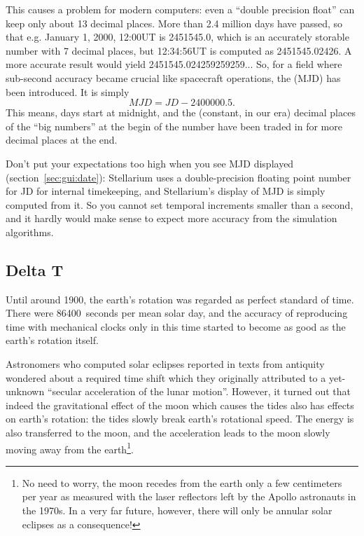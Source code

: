 This causes a problem for modern computers: even a ``double precision
float'' can keep only about 13 decimal places. More than 2.4 million
days have passed, so that e.g. January 1, 2000, 12:00UT is 2451545.0,
which is an accurately storable number with 7 decimal places, but 12:34:56UT is computed as
2451545.02426. A more accurate result would yield
2451545.024259259259... So, for a field where sub-second accuracy
became crucial like spacecraft operations, the  (MJD) has been introduced. It is simply
\begin{equation}
  \label{eq:MJD}
  MJD=JD-2400000.5. 
\end{equation}
This means, days start at midnight, and the (constant, in our era)
decimal places of the ``big numbers'' at the begin of the number have
been traded in for more decimal places at the end. 

Don't put your expectations too high when you see MJD displayed
(section~\ref{sec:gui:date}): Stellarium uses a double-precision
floating point number for JD for internal timekeeping, and Stellarium's
display of MJD is simply computed from it. So you cannot set temporal
increments smaller than a second, and it hardly would make sense to
expect more accuracy from the simulation algorithms.


\subsection{Delta T}
\label{sec:Concepts:DeltaT}

Until around 1900, the earth's rotation was regarded as perfect
standard of time. There were 86400~seconds per mean solar day, and the
accuracy of reproducing time with mechanical clocks only in this time
started to become as good as the earth's rotation itself.

Astronomers who computed solar eclipses reported in texts from
antiquity wondered about a required time shift which they originally
attributed to a yet-unknown ``secular acceleration of the lunar
motion''. However, it turned out that indeed the gravitational effect
of the moon which causes the tides also has effects on earth's
rotation: the tides slowly break earth's rotational speed. The energy
is also transferred to the moon, and the acceleration leads to the
moon slowly moving away from the earth\footnote{No need to worry, the
  moon recedes from the earth only a few centimeters per year as
  measured with the laser reflectors left by the Apollo astronauts in
  the 1970s. In a very far future, however, there will only be annular
  solar eclipses as a consequence!}.

